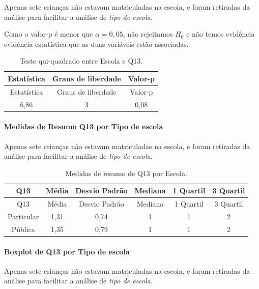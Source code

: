 \documentclass[]{article}
\let\oldparagraph\paragraph
\renewcommand{\paragraph}[1]{\oldparagraph{#1}\mbox{}}
\begin{document}
Apenas sete crianças não estavam matriculadas na escola, e foram retiradas da análise para facilitar a análise de \emph{tipo de escola}.

Como o valor-p é menor que \(\alpha=0,05\), não rejeitamos \(H_0\) e não temos evidência evidência estatística que as duas variáveis estão associadas.

\begin{longtable}[]{@{}ccc@{}}
\caption{\label{tab:unnamed-chunk-85}Teste qui-quadrado entre Escola e Q13.}\tabularnewline
\toprule
Estatística & Graus de liberdade & Valor-p\tabularnewline
\midrule
\endfirsthead
\toprule
Estatística & Graus de liberdade & Valor-p\tabularnewline
\midrule
\endhead
6,86 & 3 & 0,08\tabularnewline
\bottomrule
\end{longtable}

\cleardoublepage

\hypertarget{medidas-de-resumo-q13-por-tipo-de-escola}{%
\paragraph{Medidas de Resumo Q13 por Tipo de escola}\label{medidas-de-resumo-q13-por-tipo-de-escola}}

Apenas sete crianças não estavam matriculadas na escola, e foram retiradas da análise para facilitar a análise de \emph{tipo de escola}.

\begin{longtable}[]{@{}cccccc@{}}
\caption{\label{tab:unnamed-chunk-86}Medidas de resumo de Q13 por Escola.}\tabularnewline
\toprule
Q13 & Média & Desvio Padrão & Mediana & 1 Quartil & 3 Quartil\tabularnewline
\midrule
\endfirsthead
\toprule
Q13 & Média & Desvio Padrão & Mediana & 1 Quartil & 3 Quartil\tabularnewline
\midrule
\endhead
Particular & 1,31 & 0,74 & 1 & 1 & 2\tabularnewline
Pública & 1,35 & 0,79 & 1 & 1 & 2\tabularnewline
\bottomrule
\end{longtable}

\hypertarget{boxplot-de-q13-por-tipo-de-escola}{%
\paragraph{Boxplot de Q13 por Tipo de escola}\label{boxplot-de-q13-por-tipo-de-escola}}

Apenas sete crianças não estavam matriculadas na escola, e foram retiradas da análise para facilitar a análise de \emph{tipo de escola}.
\end{document}
